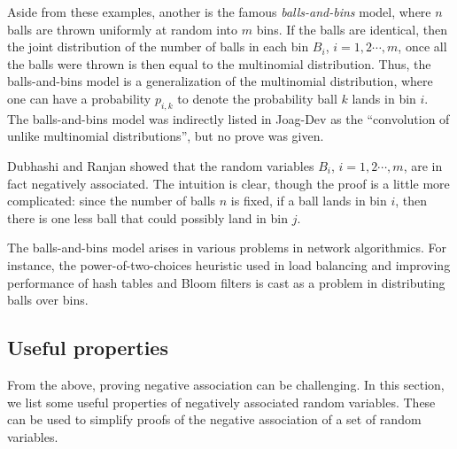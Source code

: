 Aside from these examples, another is the famous \textit{balls-and-bins} model, where $n$ balls
are thrown uniformly at random into $m$ bins. If the balls are identical, then the joint distribution of
the number of balls in each bin $B_i$, $i=1,2\cdots,m$, once all the balls were thrown is then 
equal to the multinomial distribution. Thus, the balls-and-bins model is a generalization 
of the multinomial distribution, where one can have a probability $p_{i,k}$ to denote the
probability ball $k$ lands in bin $i$. The balls-and-bins model was indirectly listed in 
Joag-Dev \etal \cite{JoagDev83NA} as the ``convolution of unlike multinomial distributions'', but
no prove was given.

Dubhashi and Ranjan \cite{Dubhashi96BallsBins} showed that the random variables 
$B_i$, $i=1,2\cdots,m$, are in fact negatively associated. The intuition is clear, though the proof is
a little more complicated: since the number of balls $n$ is fixed, if a ball lands in bin $i$, then
there is one less ball that could possibly land in bin $j$. 

The balls-and-bins model arises in various problems in network algorithmics. For instance,
the power-of-two-choices heuristic used in load balancing and improving performance of
hash tables and Bloom filters is cast as a problem in distributing balls over bins. 




\subsection{Useful properties}

From the above, proving negative association can be challenging. 
In this section, we list some useful properties of negatively associated random variables.
These can be used to simplify proofs of the negative association of a set of random variables.

